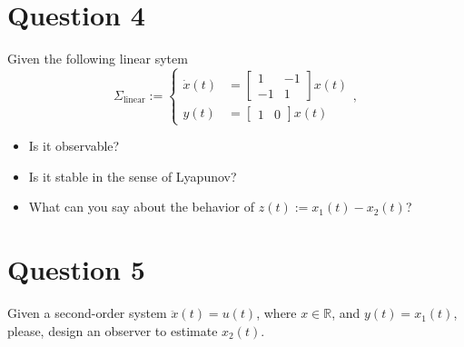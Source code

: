 \documentclass[11pt,a4paper,titlepage]{article}
\begin{document}
\section{Question 4}
Given the following linear sytem
\begin{equation}
	\Sigma_{\text{linear}} := \begin{cases}
		\dot x(t) &= \begin{bmatrix}1 & -1 \\ -1 & 1\end{bmatrix}x(t) \\
			y(t) &= \begin{bmatrix}1 & 0\end{bmatrix}x(t)
	\end{cases},
\label{eq: sigmalin}
\end{equation}

\begin{itemize}
\item Is it observable?
\item Is it stable in the sense of Lyapunov?
\item What can you say about the behavior of $z(t) := x_1(t) - x_2(t)$?
\end{itemize}

\section{Question 5}
Given a second-order system $\ddot x(t) = u(t)$, where $x\in\mathbb{R}$, and $y(t) = x_1(t)$, please, design an observer to estimate $x_2(t)$.
\end{document}

